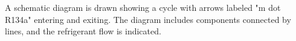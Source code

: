A schematic diagram is drawn showing a cycle with arrows labeled "m dot R134a" entering and exiting. The diagram includes components connected by lines, and the refrigerant flow is indicated.